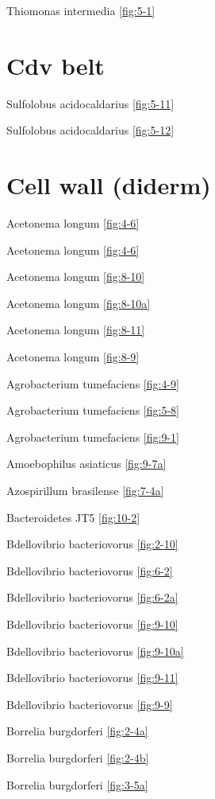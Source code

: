 \documentclass[]{tufte-book}
\begin{document}
Thiomonas intermedia \ref{fig:5-1}

\hypertarget{cdv-belt}{%
\section*{Cdv belt}\label{cdv-belt}}

Sulfolobus acidocaldarius \ref{fig:5-11}

Sulfolobus acidocaldarius \ref{fig:5-12}

\hypertarget{cell-wall-diderm}{%
\section*{Cell wall (diderm)}\label{cell-wall-diderm}}

Acetonema longum \ref{fig:4-6}

Acetonema longum \ref{fig:4-6}

Acetonema longum \ref{fig:8-10}

Acetonema longum \ref{fig:8-10a}

Acetonema longum \ref{fig:8-11}

Acetonema longum \ref{fig:8-9}

Agrobacterium tumefaciens \ref{fig:4-9}

Agrobacterium tumefaciens \ref{fig:5-8}

Agrobacterium tumefaciens \ref{fig:9-1}

Amoebophilus asiaticus \ref{fig:9-7a}

Azospirillum brasilense \ref{fig:7-4a}

Bacteroidetes JT5 \ref{fig:10-2}

Bdellovibrio bacteriovorus \ref{fig:2-10}

Bdellovibrio bacteriovorus \ref{fig:6-2}

Bdellovibrio bacteriovorus \ref{fig:6-2a}

Bdellovibrio bacteriovorus \ref{fig:9-10}

Bdellovibrio bacteriovorus \ref{fig:9-10a}

Bdellovibrio bacteriovorus \ref{fig:9-11}

Bdellovibrio bacteriovorus \ref{fig:9-9}

Borrelia burgdorferi \ref{fig:2-4a}

Borrelia burgdorferi \ref{fig:2-4b}

Borrelia burgdorferi \ref{fig:3-5a}
\end{document}
